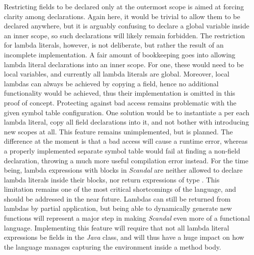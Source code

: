 Restricting fields to be declared only at the outermost scope is aimed at forcing clarity among declarations. Again here, it would be trivial to allow them to be declared anywhere, but it is arguably confusing to declare a global variable inside an inner scope, so such declarations will likely remain forbidden. The restriction for lambda literals, however, is not deliberate, but rather the result of an incomplete implementation. A fair amount of bookkeeping goes into allowing lambda literal declarations into an inner scope. For one, these would need to be local variables, and currently all lambda literals are global. Moreover, local lambdas can always be achieved by copying a field, hence no additional functionality would be achieved, thus their implementation is omitted in this proof of concept. Protecting against bad access remains problematic with the given symbol table configuration. One solution would be to instantiate a  per each lambda literal, copy all field declarations into it, and not bother with introducing new scopes at all. This feature remains unimplemented, but is planned. The difference at the moment is that a bad access will cause a runtime error, whereas a properly implemented separate symbol table would fail at finding a non-field declaration, throwing a much more useful compilation error instead. For the time being, lambda expressions with blocks in \emph{Scandal} are neither allowed to declare lambda literals inside their blocks, nor return expressions of type . This limitation remains one of the most critical shortcomings of the language, and should be addressed in the near future. Lambdas can still be returned from lambdas by partial application, but being able to dynamically generate new functions will represent a major step in making \emph{Scandal} even more of a functional language. Implementing this feature will require that not all lambda literal expressions be fields in the \emph{Java} class, and will thus have a huge impact on how the language manages capturing the environment inside a method body.

